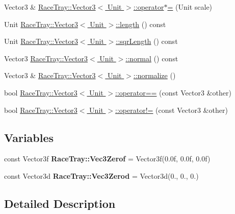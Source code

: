\begin{DoxyCompactItemize}
\item 
Vector3 \& \hyperlink{group___math_gaf2ead3fae3ec911d2d0ece2c88f0488c}{Race\-Tray\-::\-Vector3$<$ Unit $>$\-::operator$\ast$=} (Unit scale)
\item 
Unit \hyperlink{group___math_ga060ae22a7ea4202c7d401bbcb0c0732d}{Race\-Tray\-::\-Vector3$<$ Unit $>$\-::length} () const 
\item 
Unit \hyperlink{group___math_ga0642d7d561ce609f96b1df8ad6c8bb8a}{Race\-Tray\-::\-Vector3$<$ Unit $>$\-::sqr\-Length} () const 
\item 
Vector3 \hyperlink{group___math_ga822111c5601c2d6b8dab069acd2df835}{Race\-Tray\-::\-Vector3$<$ Unit $>$\-::normal} () const 
\item 
Vector3 \& \hyperlink{group___math_ga606bb7deceeda5a9cab17e22e1aed668}{Race\-Tray\-::\-Vector3$<$ Unit $>$\-::normalize} ()
\item 
bool \hyperlink{group___math_gacc0738d9f3ef7de9deb35b27472e6397}{Race\-Tray\-::\-Vector3$<$ Unit $>$\-::operator==} (const Vector3 \&other)
\item 
bool \hyperlink{group___math_ga618208f396f28328642826f06fcab560}{Race\-Tray\-::\-Vector3$<$ Unit $>$\-::operator!=} (const Vector3 \&other)
\end{DoxyCompactItemize}
\subsection*{Variables}
\begin{DoxyCompactItemize}
\item 
\hypertarget{group___math_ga8d3973ce6918cf08abf046cc763886ca}{const Vector3f {\bfseries Race\-Tray\-::\-Vec3\-Zerof} = Vector3f(0.\-0f, 0.\-0f, 0.\-0f)}\label{group___math_ga8d3973ce6918cf08abf046cc763886ca}

\item 
\hypertarget{group___math_gad344ee7babbd87315c3394b37c288a1a}{const Vector3d {\bfseries Race\-Tray\-::\-Vec3\-Zerod} = Vector3d(0., 0., 0.)}\label{group___math_gad344ee7babbd87315c3394b37c288a1a}

\end{DoxyCompactItemize}


\subsection{Detailed Description}


